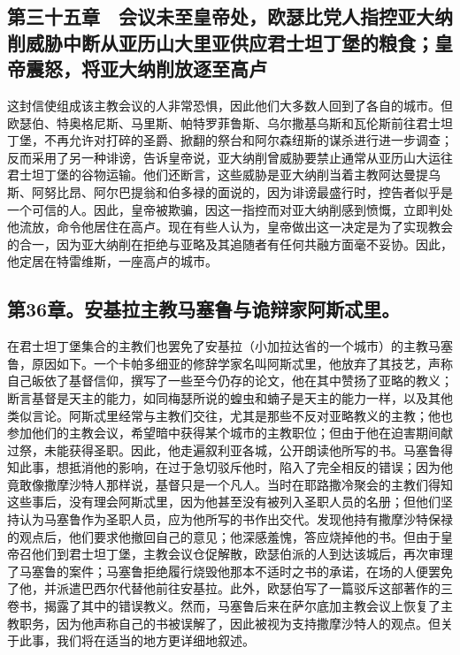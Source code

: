 \subsection{第三十五章　会议未至皇帝处，欧瑟比党人指控亚大纳削威胁中断从亚历山大里亚供应君士坦丁堡的粮食；皇帝震怒，将亚大纳削放逐至高卢}

这封信使组成该主教会议的人非常恐惧，因此他们大多数人回到了各自的城市。但欧瑟伯、特奥格尼斯、马里斯、帕特罗菲鲁斯、乌尔撒基乌斯和瓦伦斯前往君士坦丁堡，不再允许对打碎的圣爵、掀翻的祭台和阿尔森纽斯的谋杀进行进一步调查；反而采用了另一种诽谤，告诉皇帝说，亚大纳削曾威胁要禁止通常从亚历山大运往君士坦丁堡的谷物运输。他们还断言，这些威胁是亚大纳削当着主教阿达曼提乌斯、阿努比昂、阿尔巴提翁和伯多禄的面说的，因为诽谤最盛行时，控告者似乎是一个可信的人。因此，皇帝被欺骗，因这一指控而对亚大纳削感到愤慨，立即判处他流放，命令他居住在高卢。现在有些人认为，皇帝做出这一决定是为了实现教会的合一，因为亚大纳削在拒绝与亚略及其追随者有任何共融方面毫不妥协。因此，他定居在特雷维斯，一座高卢的城市。\par


\subsection{第36章。安基拉主教马塞鲁与诡辩家阿斯忒里。}

在君士坦丁堡集合的主教们也罢免了安基拉（小加拉达省的一个城市）的主教马塞鲁，原因如下。一个卡帕多细亚的修辞学家名叫阿斯忒里，他放弃了其技艺，声称自己皈依了基督信仰，撰写了一些至今仍存的论文，他在其中赞扬了亚略的教义；断言基督是天主的能力，如同梅瑟所说的蝗虫和蝻子是天主的能力一样，以及其他类似言论。阿斯忒里经常与主教们交往，尤其是那些不反对亚略教义的主教；他也参加他们的主教会议，希望暗中获得某个城市的主教职位；但由于他在迫害期间献过祭，未能获得圣职。因此，他走遍叙利亚各城，公开朗读他所写的书。马塞鲁得知此事，想抵消他的影响，在过于急切驳斥他时，陷入了完全相反的错误；因为他竟敢像撒摩沙特人那样说，基督只是一个凡人。当时在耶路撒冷聚会的主教们得知这些事后，没有理会阿斯忒里，因为他甚至没有被列入圣职人员的名册；但他们坚持认为马塞鲁作为圣职人员，应为他所写的书作出交代。发现他持有撒摩沙特保禄的观点后，他们要求他撤回自己的意见；他深感羞愧，答应烧掉他的书。但由于皇帝召他们到君士坦丁堡，主教会议仓促解散，欧瑟伯派的人到达该城后，再次审理了马塞鲁的案件；马塞鲁拒绝履行烧毁他那本不适时之书的承诺，在场的人便罢免了他，并派遣巴西尔代替他前往安基拉。此外，欧瑟伯写了一篇驳斥这部著作的三卷书，揭露了其中的错误教义。然而，马塞鲁后来在萨尔底加主教会议上恢复了主教职务，因为他声称自己的书被误解了，因此被视为支持撒摩沙特人的观点。但关于此事，我们将在适当的地方更详细地叙述。\par

